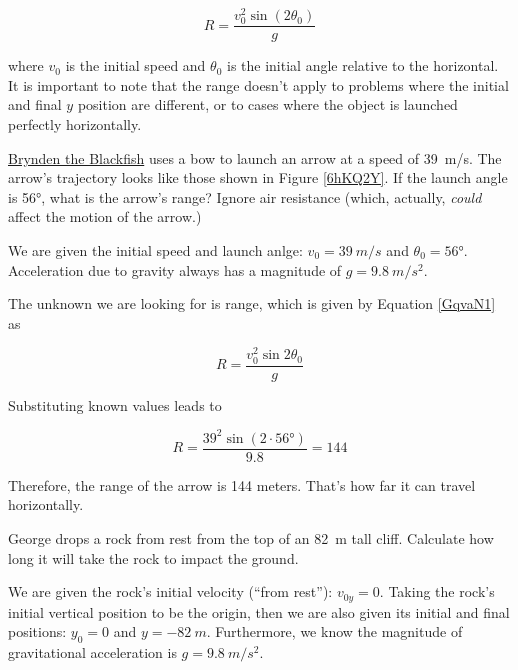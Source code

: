 \documentclass[dvipsnames]{article}
\numberwithin{equation}{section}
\numberwithin{figure}{section}
\begin{document}
\begin{equation} \label{GqvaN1}
    R = \frac{v_0^2 \sin{(2\theta_0)}}{g}
\end{equation}

where $v_0$ is the initial speed and $\theta_0$ is the initial angle relative to the horizontal. It is important to note that the range doesn't apply to problems where the initial and final $y$ position are different, or to cases where the object is launched perfectly horizontally.

\begin{example}
    \href{https://youtu.be/9Ijev8RHF04}{Brynden the Blackfish} uses a bow to launch an arrow at a speed of \SI{39}{m/s}. The arrow's trajectory looks like those shown in Figure \ref{6hKQ2Y}. If the launch angle is \ang{56}, what is the arrow's range? Ignore air resistance (which, actually, \textit{could} affect the motion of the arrow.) 
\end{example}

\Solution We are given the initial speed and launch anlge: $v_0 = \SI{39}{m/s}$ and $\theta_0 = \ang{56}$. Acceleration due to gravity always has a magnitude of $g = \SI{9.8}{m/s^2}$. 

\vspace{1em}

The unknown we are looking for is range, which is given by Equation \eqref{GqvaN1} as

\begin{equation*}
    R = \frac{v_0^2 \sin{2\theta_0}}{g}
\end{equation*}

Substituting known values leads to

\begin{equation*}
    R = \frac{39^2 \sin{(2 \cdot \ang{56})}}{9.8} = 144
\end{equation*}

Therefore, the range of the arrow is 144 meters. That's how far it can travel horizontally.

\solutionEnd

\begin{example} \label{9XXF9X}
    George drops a rock from rest from the top of an \SI{82}{m} tall cliff. Calculate how long it will take the rock to impact the ground. 
\end{example}

\Solution We are given the rock's initial velocity (``from rest''): $v_{0y} = 0$. Taking the rock's initial vertical position to be the origin, then we are also given its initial and final positions: $y_0 = 0$ and $y = \SI{-82}{m}$. Furthermore, we know the magnitude of gravitational acceleration is $g = \SI{9.8}{m/s^2}$. 
\end{document}
